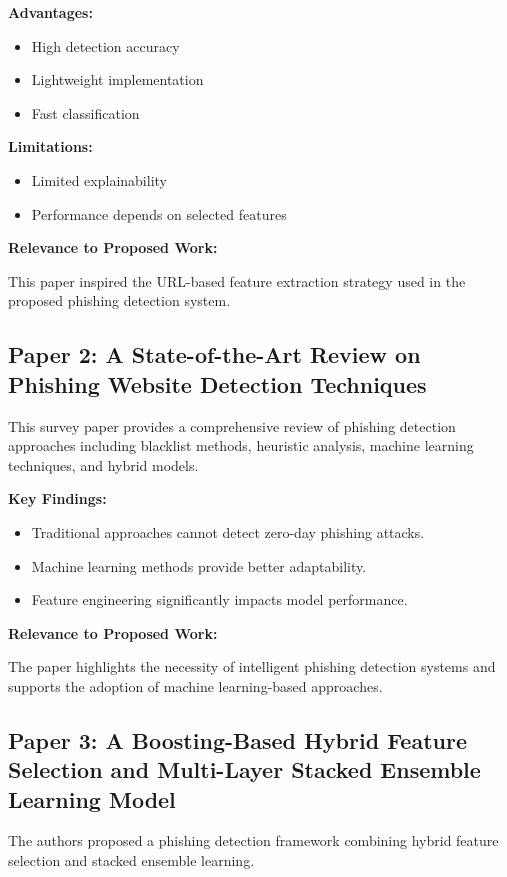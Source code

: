 \documentclass[12pt]{report}
\begin{document}
\textbf{Advantages:}
\begin{itemize}
    \item High detection accuracy
    \item Lightweight implementation
    \item Fast classification
\end{itemize}

\textbf{Limitations:}
\begin{itemize}
    \item Limited explainability
    \item Performance depends on selected features
\end{itemize}

\textbf{Relevance to Proposed Work:}

This paper inspired the URL-based feature extraction strategy used in the proposed phishing detection system.

\subsection{Paper 2: A State-of-the-Art Review on Phishing Website Detection Techniques}

This survey paper provides a comprehensive review of phishing detection approaches including blacklist methods, heuristic analysis, machine learning techniques, and hybrid models.

\textbf{Key Findings:}
\begin{itemize}
    \item Traditional approaches cannot detect zero-day phishing attacks.
    \item Machine learning methods provide better adaptability.
    \item Feature engineering significantly impacts model performance.
\end{itemize}

\textbf{Relevance to Proposed Work:}

The paper highlights the necessity of intelligent phishing detection systems and supports the adoption of machine learning-based approaches.

\subsection{Paper 3: A Boosting-Based Hybrid Feature Selection and Multi-Layer Stacked Ensemble Learning Model}

The authors proposed a phishing detection framework combining hybrid feature selection and stacked ensemble learning.
\end{document}
